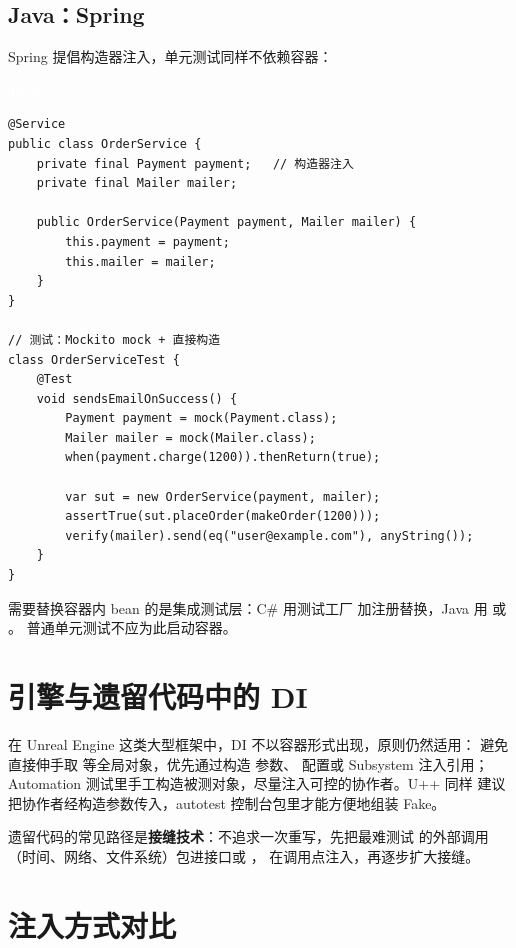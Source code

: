 \documentclass[12pt,a4paper,fontset=fandol]{ctexbook}
\newcommand{\javalabel}{%
  \begin{tcolorbox}[enhanced,colback=javaheadbg,colframe=javaheadbg,
    arc=1mm,boxrule=0mm,left=6pt,right=6pt,top=2pt,bottom=2pt,
    halign=left,oversize]
    \textcolor{white}{\small\bfseries Java}
  \end{tcolorbox}\vspace{-4pt}}
\begin{document}
\subsection{Java：Spring}

Spring 提倡构造器注入，单元测试同样不依赖容器：

\javalabel
\begin{lstlisting}
@Service
public class OrderService {
    private final Payment payment;   // 构造器注入
    private final Mailer mailer;

    public OrderService(Payment payment, Mailer mailer) {
        this.payment = payment;
        this.mailer = mailer;
    }
}

// 测试：Mockito mock + 直接构造
class OrderServiceTest {
    @Test
    void sendsEmailOnSuccess() {
        Payment payment = mock(Payment.class);
        Mailer mailer = mock(Mailer.class);
        when(payment.charge(1200)).thenReturn(true);

        var sut = new OrderService(payment, mailer);
        assertTrue(sut.placeOrder(makeOrder(1200)));
        verify(mailer).send(eq("user@example.com"), anyString());
    }
}
\end{lstlisting}

需要替换容器内 bean 的是集成测试层：C\# 用测试工厂
 加注册替换，Java 用
 或 。
普通单元测试不应为此启动容器。

\section{引擎与遗留代码中的 DI}

在 Unreal Engine 这类大型框架中，DI 不以容器形式出现，原则仍然适用：
避免直接伸手取  等全局对象，优先通过构造
参数、 配置或 Subsystem 注入引用；
Automation 测试里手工构造被测对象，尽量注入可控的协作者。U++ 同样
建议把协作者经构造参数传入，autotest 控制台包里才能方便地组装 Fake。

遗留代码的常见路径是\textbf{接缝技术}：不追求一次重写，先把最难测试
的外部调用（时间、网络、文件系统）包进接口或 ，
在调用点注入，再逐步扩大接缝。

\section{注入方式对比}
\end{document}
